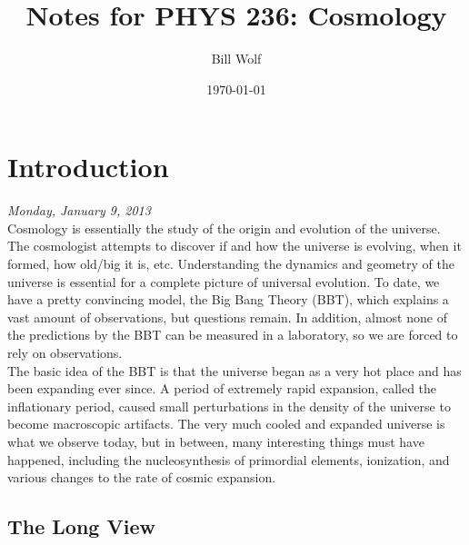 \documentclass[10pt]{article}
\title{Notes for PHYS 236: Cosmology}
\author{Bill Wolf}
\date{\today}
\numberwithin{equation}{section}
\newcommand{\n}{\noindent}
\begin{document}
\vfill\maketitle\vfill \newpage

\tableofcontents \newpage


\section{Introduction} %
\label{sec:introduction}
	\emph{Monday, January 9, 2013}\\
	
	\n Cosmology is essentially the study of the origin and evolution of the universe. The cosmologist attempts to discover if and how the universe is evolving, when it formed, how old/big it is, etc. Understanding the dynamics and geometry of the universe is essential for a complete picture of universal evolution. To date, we have a pretty convincing model, the Big Bang Theory (BBT), which explains a vast amount of observations, but questions remain. In addition, almost none of the predictions by the BBT can be measured in a laboratory, so we are forced to rely on observations.\\
	
	\n The basic idea of the BBT is that the universe began as a very hot place and has been expanding ever since. A period of extremely rapid expansion, called the inflationary period, caused small perturbations in the density of the universe to become macroscopic artifacts. The very much cooled and expanded universe is what we observe today, but in between, many interesting things must have happened, including the nucleosynthesis of primordial elements, ionization, and various changes to the rate of cosmic expansion.
	
	\subsection{The Long View} %
	\label{sub:the_long_view}
	
\end{document}
